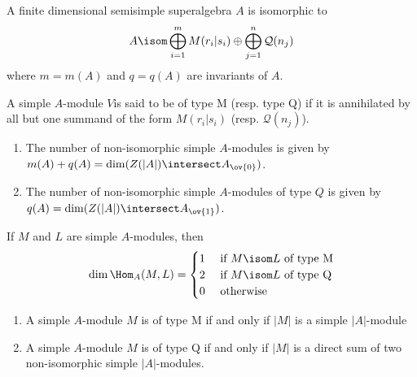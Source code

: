 \documentclass[11pt,leqno,oneside]{amsbook}
\renewcommand{\Q}{\mathcal{Q}}
\numberwithin{thm}{section}
\begin{document}
\begin{cor}
   A finite dimensional semisimple superalgebra \(A\) is isomorphic
   to \[
     A \isom \bigoplus_{i=1}^m M(r_i|s_i) \oplus \bigoplus_{j=1}^n \Q(n_j)
   \]
   where \(m = m(A)\) and \(q=q(A)\) are invariants of \(A\).
 \end{cor}
 \begin{defn}
   A simple \(A\)-module \(V\)is said to be of type M (resp. type Q)
   if it is annihilated by all but one summand of the form
   \(M(r_i|s_i)\) (resp. \(\Q(n_j)\)).
 \end{defn}
 \begin{cor}
   \begin{enumerate}
   \item The number of non-isomorphic simple \(A\)-modules is given by
     \(m(A)+q(A) = \dim (Z(|A|) \intersect A_{\ov{0}})\).
   \item The number of non-isomorphic simple \(A\)-modules of type
     \(Q\) is given by \(q(A) = \dim(Z(|A|) \intersect A_{\ov{1}})\).
   \end{enumerate}
 \end{cor}
 \begin{thm}
   If \(M\) and \(L\) are simple \(A\)-modules, then \[
     \dim\Hom_A(M,L) =
     \begin{cases}
       1 & \text{ if }M \isom L\text{ of type M}\\
       2 & \text{ if }M \isom L\text{ of type Q}\\
       0 & \text{ otherwise}
     \end{cases}
   \]
\end{thm}
\begin{rmk}
  \begin{enumerate}
  \item A simple \(A\)-module \(M\) is of type M if and only if
    \(|M|\) is a simple \(|A|\)-module
  \item A simple \(A\)-module \(M\) is of type Q if and only if
    \(|M|\) is a direct sum of two non-isomorphic simple \(|A|\)-modules.
  \end{enumerate}
\end{rmk}
\end{document}
